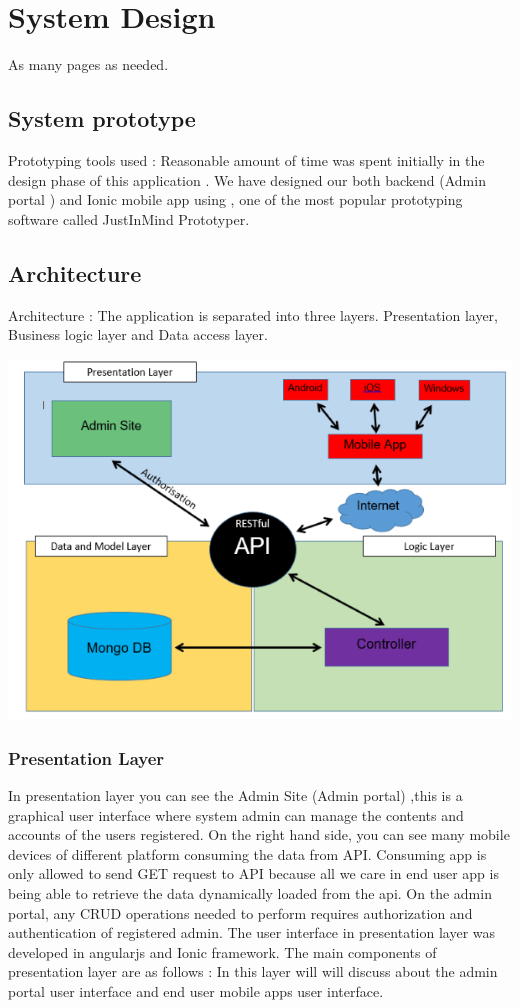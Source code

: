 \chapter{System Design}
As many pages as needed.
	\section {System prototype}
	Prototyping tools used : Reasonable amount of time was spent initially in the design phase of this application . We have designed our both backend (Admin portal ) and Ionic mobile app using , one of the most popular prototyping software called JustInMind Prototyper. 
	
	\section{Architecture}
	Architecture : The application is separated into three layers.  Presentation layer, Business logic layer and Data access layer.
	\begin{center}    
		\includegraphics{img/architecture.PNG}
	\end{center}
		\subsection{Presentation Layer}
		 In presentation layer you can see the Admin Site (Admin portal) ,this is a graphical user interface where system admin can manage the contents and accounts of the users registered.  On the right hand side, you can see many mobile devices of different platform consuming the data from API. Consuming app is only allowed to send GET request to API because all we care in end user app is being able to retrieve the data dynamically loaded from the api. On the admin portal, any CRUD operations needed to perform requires authorization and authentication of registered admin. The user interface in presentation layer was developed in angularjs and Ionic framework. The main components of presentation layer are as follows : In this layer will will discuss about the admin portal user interface and end user mobile apps user interface. 
		
